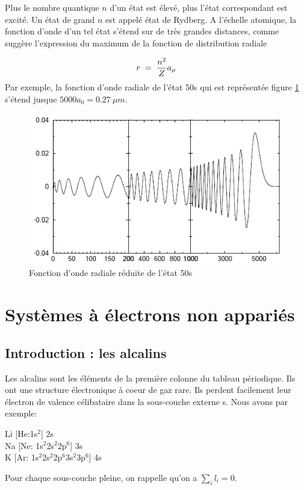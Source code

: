 Plus le nombre quantique $n$ d'un état est élevé, plus l'état correspondant est excité. Un état de grand $n$ est appelé état de Rydberg. A l'échelle atomique, la fonction d'onde d'un tel état s'étend sur de très grandes distances, comme suggère l'expression du maximum de la fonction de distribution radiale

\[
    r\; = \; \dfrac{n^2}{Z}a_{\mu}
\]
Par exemple, la fonction d'onde radiale de l'état 50s qui est représentée figure \ref{fig:50s} s'étend jusque $5000a_0= \SI{0.27}{\mu m}$.

\begin{figure}[htp]
    \centering
    \includegraphics{Images2/50s.PNG}
    \caption{Fonction d'onde radiale réduite de l'état 50s}
    \label{fig:50s}
\end{figure}





\newpage

\section{Systèmes à électrons non appariés}
\subsection{Introduction : les alcalins}

Les alcalins sont les éléments de la première colonne du tableau périodique. Ils ont une structure électronique à coeur de gaz rare. Ils perdent facilement leur électron de valence célibataire dans la sous-couche externe s. Nous avons par exemple:

\begin{center}
    Li [He:1s$^{2}$] 2s \\
    Na [Ne: 1s$^{2}$2s$^{2}$2p$^{6}$] 3s \\
    K [Ar: 1s$^{2}$2s$^{2}$2p$^{6}$3s$^{2}$3p$^{6}$] 4s
\end{center}
Pour chaque sous-couche pleine, on rappelle qu'on a $\sum_i l_i = 0$.

